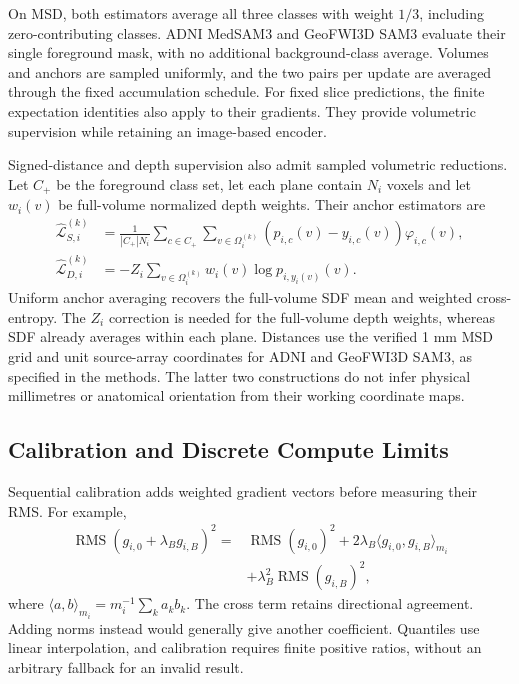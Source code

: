 \documentclass[12pt,a4paper]{article}
\begin{document}
On MSD, both estimators average all three classes with weight $1/3$,
including zero-contributing classes. ADNI MedSAM3 and GeoFWI3D SAM3
evaluate their single foreground mask, with no additional
background-class average. Volumes and anchors are sampled
uniformly, and the two pairs per update are averaged through the
fixed accumulation schedule. For fixed slice predictions, the finite
expectation identities also apply to their gradients. They provide
volumetric supervision while retaining an image-based encoder.


Signed-distance and depth supervision also admit sampled volumetric
reductions. Let $C_+$ be the foreground class set, let each plane
contain $N_i$ voxels and let $w_i(v)$ be full-volume normalized depth
weights. Their anchor estimators are
\begin{align}
\widehat{\mathcal L}_{S,i}^{(k)}
 &=\frac{1}{|C_+|N_i}\sum_{c\in C_+}
   \sum_{v\in\Omega_i^{(k)}}(p_{i,c}(v)-y_{i,c}(v))\varphi_{i,c}(v),
   \label{eq:medsam-sampled-sdf}\\
\widehat{\mathcal L}_{D,i}^{(k)}
 &=-Z_i\sum_{v\in\Omega_i^{(k)}}w_i(v)\log p_{i,y_i(v)}(v).
   \label{eq:medsam-sampled-depth}
\end{align}
Uniform anchor averaging recovers the full-volume SDF mean and weighted
cross-entropy. The $Z_i$ correction is needed for the full-volume depth
weights, whereas SDF already averages within each plane. Distances use the
verified 1 mm MSD grid and unit source-array coordinates for ADNI and
GeoFWI3D SAM3, as specified in the methods. The latter two constructions
do not infer physical millimetres or anatomical orientation from their
working coordinate maps.

\subsection{Calibration and Discrete Compute Limits}

Sequential calibration adds weighted gradient vectors before measuring
their RMS. For example,
\begin{equation}
\begin{aligned}
\operatorname{RMS}(g_{i,0}+\lambda_B g_{i,B})^2
={}&\operatorname{RMS}(g_{i,0})^2
 +2\lambda_B\langle g_{i,0},g_{i,B}\rangle_{m_i}\\
 &+\lambda_B^2\operatorname{RMS}(g_{i,B})^2,
\end{aligned}
\label{eq:calibration-cross-term}
\end{equation}
where $\langle a,b\rangle_{m_i}=m_i^{-1}\sum_k a_kb_k$.
The cross term retains directional agreement. Adding norms instead
would generally give another coefficient. Quantiles use linear
interpolation, and calibration requires finite positive ratios,
without an arbitrary fallback for an invalid result.
\end{document}
